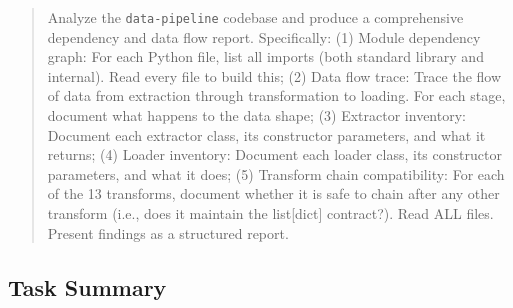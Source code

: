 \begin{quote}
Analyze the \texttt{data-pipeline} codebase and produce a comprehensive dependency and data flow report. Specifically: (1) Module dependency graph: For each Python file, list all imports (both standard library and internal). Read every file to build this; (2) Data flow trace: Trace the flow of data from extraction through transformation to loading. For each stage, document what happens to the data shape; (3) Extractor inventory: Document each extractor class, its constructor parameters, and what it returns; (4) Loader inventory: Document each loader class, its constructor parameters, and what it does; (5) Transform chain compatibility: For each of the 13 transforms, document whether it is safe to chain after any other transform (i.e., does it maintain the list[dict] contract?). Read ALL files. Present findings as a structured report.
\end{quote}

\subsection{Task Summary}

